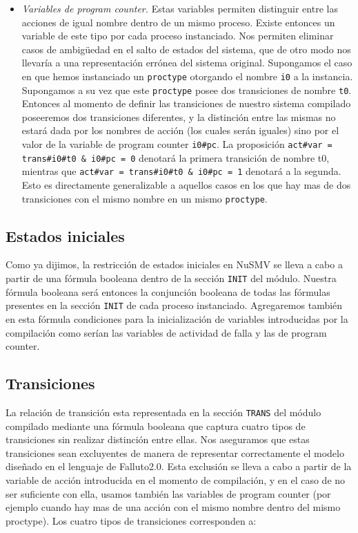 \documentclass[pdftex,a4paper,12pt]{book}
\begin{document}
\begin{itemize}
\item \textit{Variables de program counter.} Estas variables permiten distinguir entre las acciones de igual nombre dentro de un mismo proceso. Existe entonces un variable de este tipo por cada proceso instanciado. Nos permiten eliminar casos de ambig\"{u}edad en el salto de estados del sistema, que de otro modo nos llevar\'ia a una representaci\'on err\'onea del sistema original. Supongamos el caso en que hemos instanciado un \texttt{proctype} otorgando el nombre \texttt{i0} a la instancia. Supongamos a su vez que este \texttt{proctype} posee dos transiciones de nombre \texttt{t0}. Entonces al momento de definir las transiciones de nuestro sistema compilado poseeremos dos transiciones diferentes, y la distinci\'on entre las mismas no estar\'a dada por los nombres de acci\'on (los cuales ser\'an iguales) sino por el valor de la variable de program counter \texttt{i0\#pc}. La proposici\'on \texttt{act\#var = trans\#i0\#t0 \& i0\#pc = 0} denotar\'a la primera transici\'on de nombre t0, mientras que \texttt{act\#var = trans\#i0\#t0 \& i0\#pc = 1} denotar\'a a la segunda. Esto es directamente generalizable a aquellos casos en los que hay mas de dos transiciones con el mismo nombre en un mismo \texttt{proctype}.
\end{itemize}


\subsection*{Estados iniciales}
Como ya dijimos, la restricci\'on de estados iniciales en NuSMV se lleva a cabo a partir de una f\'ormula booleana dentro de la secci\'on \texttt{INIT} del m\'odulo. Nuestra f\'ormula booleana ser\'a entonces la conjunci\'on booleana de todas las f\'ormulas presentes en la secci\'on \texttt{INIT} de cada proceso instanciado. Agregaremos tambi\'en en esta f\'ormula condiciones para la inicializaci\'on de variables introducidas por la compilaci\'on como ser\'ian las variables de actividad de falla y las de program counter.

\subsection*{Transiciones}
La relaci\'on de transici\'on esta representada en la secci\'on \texttt{TRANS} del m\'odulo compilado mediante una f\'ormula booleana que captura cuatro tipos de transiciones sin realizar distinci\'on entre ellas. Nos aseguramos que estas transiciones sean excluyentes de manera de representar correctamente el modelo dise\~nado en el lenguaje de Falluto2.0. Esta exclusi\'on se lleva a cabo a partir de la variable de acci\'on introducida en el momento de compilaci\'on, y en el caso de no ser suficiente con ella, usamos tambi\'en las variables de program counter (por ejemplo cuando hay mas de una acci\'on con el mismo nombre dentro del mismo proctype). Los cuatro tipos de transiciones corresponden a:
\end{document}
